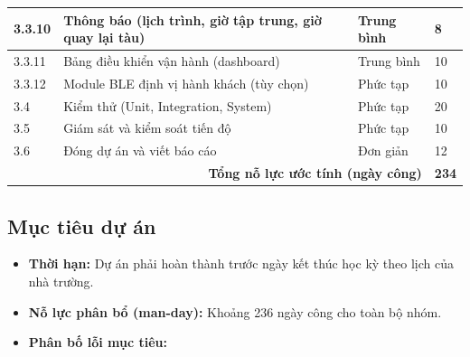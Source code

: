 \begin{table}[htbp]
{\begin{tabular}{|p{1cm}|p{7cm}|p{2.3cm}|p{2cm}|}
        \hline
        3.3.10 & Thông báo (lịch trình, giờ tập trung, giờ quay lại tàu) & Trung bình & 8 \\
        \hline
        3.3.11 & Bảng điều khiển vận hành (dashboard) & Trung bình & 10 \\
        \hline
        3.3.12 & Module BLE định vị hành khách (tùy chọn) & Phức tạp & 10 \\
        \hline
        3.4 & Kiểm thử (Unit, Integration, System) & Phức tạp & 20 \\
        \hline
        3.5 & Giám sát và kiểm soát tiến độ & Phức tạp & 10 \\
        \hline
        3.6 & Đóng dự án và viết báo cáo & Đơn giản & 12 \\
        \hline
        \multicolumn{3}{|r|}{\textbf{Tổng nỗ lực ước tính (ngày công)}} & \textbf{234} \\
        \hline
    \end{tabular}
    }
\end{table}

\subsection{Mục tiêu dự án}
\begin{itemize}
    \item \textbf{Thời hạn:} Dự án phải hoàn thành trước ngày kết thúc học kỳ theo lịch của nhà trường.
    \item \textbf{Nỗ lực phân bổ (man-day):} Khoảng 236 ngày công cho toàn bộ nhóm.
    \item \textbf{Phân bố lỗi mục tiêu:}
\end{itemize}

\begin{table}[htbp]
    \centering
    \small
    \caption{Mục tiêu phân bố lỗi theo giai đoạn kiểm thử}
\end{table}

